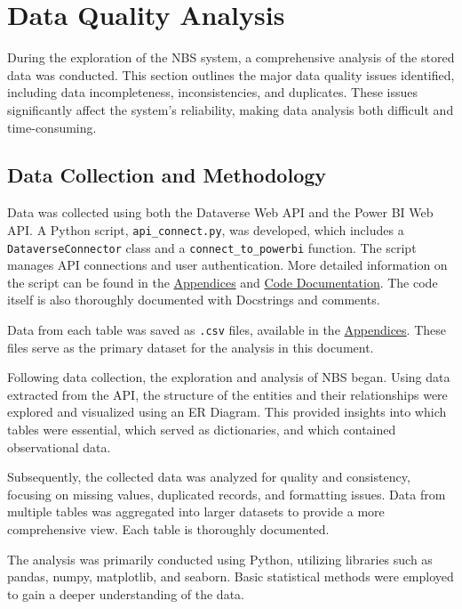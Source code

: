 \section{Data Quality Analysis}

During the exploration of the NBS system, a comprehensive analysis of the stored data was conducted. This section outlines the major data quality issues identified, including data incompleteness, inconsistencies, and duplicates. These issues significantly affect the system’s reliability, making data analysis both difficult and time-consuming.

\subsection{Data Collection and Methodology}

Data was collected using both the Dataverse Web API and the Power BI Web API. A Python script, \texttt{api\_connect.py}, was developed, which includes a \texttt{DataverseConnector} class and a \texttt{connect\_to\_powerbi} function. The script manages API connections and user authentication. More detailed information on the script can be found in the \hyperref[sec:Appendices]{Appendices} and \hyperref[sec:CodeDocumentation]{Code Documentation}. The code itself is also thoroughly documented with Docstrings and comments.

Data from each table was saved as \texttt{.csv} files, available in the \hyperref[sec:Appendices]{Appendices}. These files serve as the primary dataset for the analysis in this document.

Following data collection, the exploration and analysis of NBS began. Using data extracted from the API, the structure of the entities and their relationships were explored and visualized using an ER Diagram. This provided insights into which tables were essential, which served as dictionaries, and which contained observational data.

Subsequently, the collected data was analyzed for quality and consistency, focusing on missing values, duplicated records, and formatting issues. Data from multiple tables was aggregated into larger datasets to provide a more comprehensive view. Each table is thoroughly documented.

The analysis was primarily conducted using Python, utilizing libraries such as pandas, numpy, matplotlib, and seaborn. Basic statistical methods were employed to gain a deeper understanding of the data.

